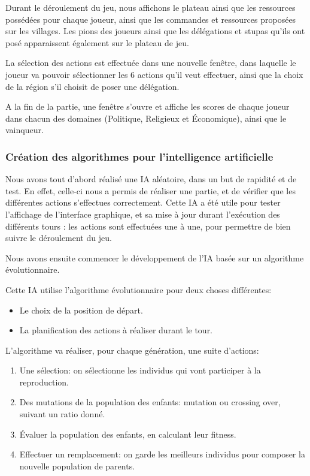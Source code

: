 		Durant le déroulement du jeu, nous affichons le plateau ainsi que les ressources
		possédées pour chaque joueur, ainsi que les commandes et ressources proposées sur
		les villages. Les pions des joueurs ainsi que les délégations et stupas qu'ils ont posé
		apparaissent également sur le plateau de jeu.
		
		La sélection des actions est effectuée dans une nouvelle fenêtre, dans laquelle
		le joueur va pouvoir sélectionner les 6 actions qu'il veut effectuer, ainsi que
		la choix de la région s'il choisit de poser une délégation.
		
		A la fin de la partie, une fenêtre s'ouvre et affiche les scores de chaque joueur
		dans chacun des domaines (Politique, Religieux et Économique), ainsi que le vainqueur.
	
	\subsubsection{Création des algorithmes pour l'intelligence artificielle}
	
		Nous avons tout d'abord réalisé une IA aléatoire, dans un but de rapidité et de test.
		En effet, celle-ci nous a permis de réaliser une partie, et de vérifier que les différentes actions 
		s'effectues correctement.
		Cette IA a été utile pour tester l'affichage de l'interface graphique, et sa
		mise à jour durant l'exécution des différents tours : les actions sont effectuées une
		à une, pour permettre de bien suivre le déroulement du jeu.
		
		Nous avons ensuite commencer le développement de l'IA basée sur un algorithme évolutionnaire.
		
		Cette IA utilise l'algorithme évolutionnaire pour deux choses différentes:
		\begin{itemize}
			\item Le choix de la position de départ.
			\item La planification des actions à réaliser durant le tour.
		\end{itemize}
	
		
		
		L'algorithme va réaliser, pour chaque génération, une suite d'actions:
		\begin{enumerate}
			\item Une sélection: on sélectionne les individus qui vont participer à la reproduction.
			\item Des mutations de la population des enfants: mutation ou crossing over, suivant un ratio donné.
			\item Évaluer la population des enfants, en calculant leur fitness.
			\item Effectuer un remplacement: on garde les meilleurs individus pour composer la nouvelle population de parents.
		\end{enumerate}
		
